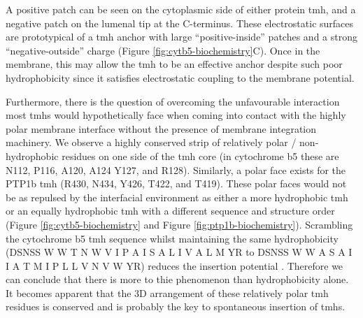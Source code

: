 A positive patch can be seen on the cytoplasmic side of either protein \gls{tmh}, and a negative patch on the lumenal tip at the C\--terminus.
These electrostatic surfaces are prototypical of a \gls{tmh} anchor with large ``positive\--inside'' patches \cite{VonHeijne1989, Andersson1992, Sharpe2010, Baeza-Delgado2013, Pogozheva2013, Baker2017} and a strong ``negative\--outside'' charge \cite{Baker2017}(Figure \ref{fig:cytb5-biochemistry}C).
Once in the membrane, this may allow the \gls{tmh} to be an effective anchor despite such poor hydrophobicity since it satisfies electrostatic coupling to the membrane potential.

Furthermore, there is the question of overcoming the unfavourable interaction most \gls{tmh}s would hypothetically face when coming into contact with the highly polar membrane interface without the presence of membrane integration machinery.
We observe a highly conserved strip of relatively polar / non-hydrophobic residues on one side of the \gls{tmh} core (in cytochrome b5 these are N112, P116, A120, A124 Y127, and R128).
Similarly, a polar face exists for the PTP1b \gls{tmh} (R430, N434, Y426, T422, and T419).
These polar faces would not be as repulsed by the interfacial environment as either a more hydrophobic \gls{tmh} or an equally hydrophobic \gls{tmh} with a different sequence and structure order (Figure \ref{fig:cytb5-biochemistry} and Figure \ref{fig:ptp1b-biochemistry}).
Scrambling the cytochrome b5 \gls{tmh} sequence whilst maintaining the same hydrophobicity (DSNSS W W T N W V I P A I S A L I V A L M YR to DSNSS W W A S A I I A T M I P L L V N V W YR) reduces the insertion potential \cite{Brambillasca2006}.
Therefore we can conclude that there is more to thie phenomenon than hydrophobicity alone.
It becomes apparent that the 3D arrangement of these relatively polar \gls{tmh} residues is conserved and is probably the key to spontaneous insertion of \gls{tmh}s.

